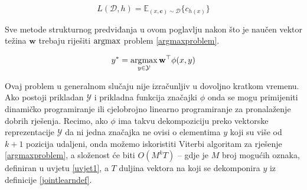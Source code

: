 \begin{equation} \label{funcloss}
  L(\mathcal{D}, h) = \mathbb{E}_{(x, \mathbf{c}) \sim \mathcal{D}} \{c_{h(x)}\}
\end{equation}

Sve metode strukturnog predviđanja u ovom poglavlju nakon što je naučen vektor
težina $\mathbf{w}$ trebaju riješiti $\operatorname*{argmax}$ problem \ref{argmaxproblem}.

\begin{equation} \label{argmaxproblem}
  y\ssymbol{1} = \argmax_{y \in \mathcal{Y}} \mathbf{w}^\top \phi(x, y)
\end{equation}

Ovaj problem u generalnom slučaju nije izračunljiv u dovoljno kratkom vremenu.
Ako postoji prikladan $\mathcal{Y}$ i prikladna funkcija značajki $\phi$ onda se
mogu primijeniti dinamičko programiranje  ili
cjelobrojno linearno programiranje  za
pronalaženje dobrih rješenja. Recimo, ako $\phi$ ima takvu dekompoziciju preko
vektorske reprezentacije $\mathcal{Y}$ da ni jedna značajka ne ovisi o
elementima $y$ koji su više od $k+1$ pozicija udaljeni, onda možemo iskoristiti
Viterbi algoritam za rješenje \ref{argmaxproblem}, a složenost će biti $O(M^k
T)$ -- gdje je $M$ broj mogućih oznaka, definiran u uvjetu \ref{uvjet1}, a $T$
duljina vektora na koji se dekomponira $y$ iz definicije \ref{jointlearndef}.

